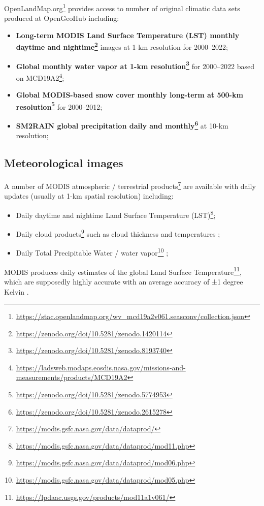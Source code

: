 \documentclass[
  graybox,natbib,nospthms]{svmono}
\providecommand{\tightlist}{%
  \setlength{\itemsep}{0pt}\setlength{\parskip}{0pt}}
\providecommand{\tightlist}{\setlength{\itemsep}{0pt}\setlength{\parskip}{0pt}}
\renewcommand{\href}[2]{#2 (\url{#1})}
\renewcommand{\href}[2]{#2\footnote{\url{#1}}}
\begin{document}
\href{https://stac.openlandmap.org/wv_mcd19a2v061.seasconv/collection.json}{OpenLandMap.org} provides access to number of original climatic data sets produced at OpenGeoHub including:

\begin{itemize}
\tightlist
\item
  \textbf{\href{https://zenodo.org/doi/10.5281/zenodo.1420114}{Long-term MODIS Land Surface Temperature (LST) monthly daytime and nightime}} images at 1-km resolution for 2000--2022;
\item
  \textbf{\href{https://zenodo.org/doi/10.5281/zenodo.8193740}{Global monthly water vapor at 1-km resolution}} for 2000--2022 based on \href{https://ladsweb.modaps.eosdis.nasa.gov/missions-and-measurements/products/MCD19A2}{MCD19A2};
\item
  \textbf{\href{https://zenodo.org/doi/10.5281/zenodo.5774953}{Global MODIS-based snow cover monthly long-term at 500-km resolution}} for 2000--2012;
\item
  \textbf{\href{https://zenodo.org/doi/10.5281/zenodo.2615278}{SM2RAIN global precipitation daily and monthly}} at 10-km resolution;
\end{itemize}

\hypertarget{meteorological-images}{%
\subsection{Meteorological images}\label{meteorological-images}}

A number of \href{https://modis.gsfc.nasa.gov/data/dataprod/}{MODIS atmospheric / terrestrial products}
are available with daily updates (usually at 1-km spatial resolution) including:

\begin{itemize}
\tightlist
\item
  \href{https://modis.gsfc.nasa.gov/data/dataprod/mod11.php}{Daily daytime and nightime Land Surface Temperature (LST)};
\item
  \href{https://modis.gsfc.nasa.gov/data/dataprod/mod06.php}{Daily cloud products} such as cloud thickness and temperatures \citep{platnick2003modis};
\item
  \href{https://modis.gsfc.nasa.gov/data/dataprod/mod05.php}{Daily Total Precipitable Water / water vapor} \citep{gao2003water};
\end{itemize}

MODIS produces \href{https://lpdaac.usgs.gov/products/mod11a1v061/}{daily estimates of the global Land Surface Temperature},
which are supposedly highly accurate with an average accuracy of ±1 degree Kelvin \citep{Wan2004}.
\end{document}
